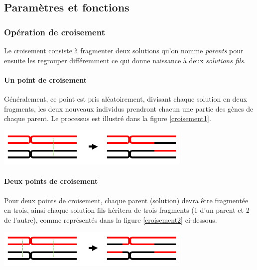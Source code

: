 \subsection{Paramètres et fonctions}

\subsubsection{Opération de croisement}
Le croisement consiste à fragmenter deux solutions qu'on nomme \textit{parents} pour ensuite les regrouper différemment ce qui donne naissance à deux \textit{solutions fils}.

\paragraph{Un point de croisement}
Généralement, ce point est pris aléatoirement, divisant chaque solution en deux fragments, les deux nouveaux individus prendront chacun une partie des gènes de chaque parent.
Le processus est illustré dans la figure \ref{croisement1}.
\begin{center}	
	\includegraphics[width=0.7\textwidth]{../Figures/crossover1.jpg}%
	\vspace{-0.3cm}
	\label{croisement1}%
\end{center}



\paragraph{Deux points de croisement}
Pour deux points de croisement, chaque parent (solution) devra être fragmentée en trois, ainsi 
 chaque solution fils héritera de trois fragments (1 d'un parent et 2 de l'autre), comme représentés dans la figure \ref{croisement2} ci-dessous.
\begin{center}
	\includegraphics[width=0.7\textwidth]{../Figures/crossover2.jpg}%
	\vspace{-0.3cm}
	\label{croisement2}%
\end{center}


